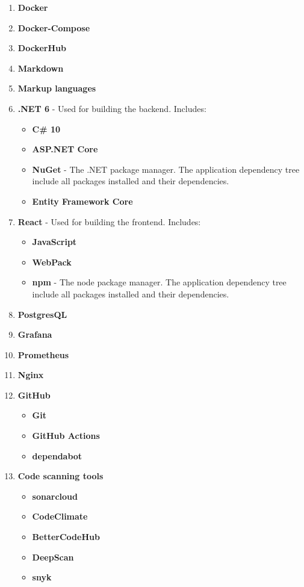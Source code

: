 \begin{enumerate}
    \item \textbf{Docker}
    \item \textbf{Docker-Compose}
    \item \textbf{DockerHub}
    \item \textbf{Markdown}
    \item \textbf{Markup languages}
    \item \textbf{.NET 6} - Used for building the backend. Includes:
    \begin{itemize}
        \item \textbf{C\# 10}
        \item \textbf{ASP.NET Core}
        \item \textbf{NuGet} - The .NET package manager. The application dependency tree include all packages installed and their dependencies.
        \item \textbf{Entity Framework Core}
    \end{itemize}
    \item \textbf{React} - Used for building the frontend. Includes:
    \begin{itemize}
        \item \textbf{JavaScript}
        \item \textbf{WebPack}
        \item \textbf{npm} - The node package manager. The application dependency tree include all packages installed and their dependencies.
    \end{itemize}
    \item \textbf{PostgresQL}
    \item \textbf{Grafana}
    \item \textbf{Prometheus}
    \item \textbf{Nginx}
    
    \item \textbf{GitHub}
    \begin{itemize}
        \item \textbf{Git}
        \item \textbf{GitHub Actions}
        \item \textbf{dependabot}
    \end{itemize}
    
    \item \textbf{Code scanning tools}
    \begin{itemize}
        \item \textbf{sonarcloud}
        \item \textbf{CodeClimate}
        \item \textbf{BetterCodeHub}
        \item \textbf{DeepScan}
        \item \textbf{snyk}
    \end{itemize}
    

\end{enumerate}
